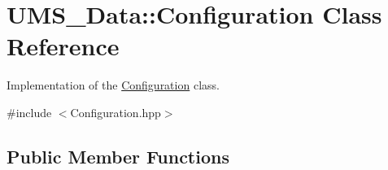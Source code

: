 \hypertarget{classUMS__Data_1_1Configuration}{
\section{UMS\_\-Data::Configuration Class Reference}
\label{classUMS__Data_1_1Configuration}
}


Implementation of the \hyperlink{classUMS__Data_1_1Configuration}{Configuration} class.  




{\ttfamily \#include $<$Configuration.hpp$>$}

\subsection*{Public Member Functions}
